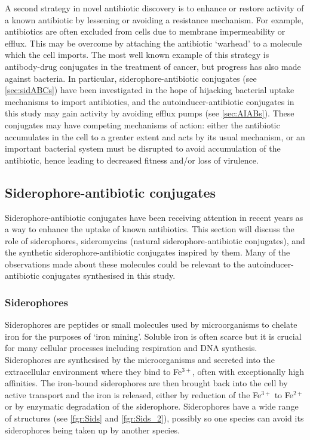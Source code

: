 A second strategy in novel antibiotic discovery is to enhance or restore activity of a known antibiotic by lessening or avoiding a resistance mechanism. For example, antibiotics are often excluded from cells due to membrane impermeability or efflux. This may be overcome by attaching the antibiotic `warhead' to a molecule which the cell imports. The most well known example of this strategy is antibody-drug conjugates\cite{Lambert2018} in the treatment of cancer, but progress has also made against bacteria. In particular, siderophore-antibiotic conjugates (see \ref{sec:sidABCs}) have been investigated in the hope of hijacking bacterial uptake mechanisms to import antibiotics\cite{Page2013}, and the autoinducer-antibiotic conjugates in this study may gain activity by avoiding efflux pumps (see \ref{sec:AIABs}). These conjugates may have competing mechanisms of action: either the antibiotic accumulates in the cell to a greater extent and acts by its usual mechanism, or an important bacterial system must be disrupted to avoid accumulation of the antibiotic, hence leading to decreased fitness and/or loss of virulence.

\subsection{Siderophore-antibiotic conjugates\label{sec:sidABCs}}

Siderophore-antibiotic conjugates have been receiving attention in recent years as a way to enhance the uptake of known antibiotics\cite{Page2013}. This section will discuss the role of siderophores, sideromycins (natural siderophore-antibiotic conjugates), and the synthetic siderophore-antibiotic conjugates inspired by them. Many of the observations made about these molecules could be relevant to the autoinducer-antibiotic conjugates synthesised in this study.

\subsubsection{Siderophores}

Siderophores are peptides or small molecules used by microorganisms to chelate iron for the purposes of `iron mining'\cite{Hider2010}. Soluble iron is often scarce but it is crucial for many cellular processes including respiration and DNA synthesis. Siderophores are synthesised by the microorganisms and secreted into the extracellular environment where they bind to Fe$^{3+}$, often with exceptionally high affinities. The iron-bound siderophores are then brought back into the cell by active transport and the iron is released, either by reduction of the Fe$^{3+}$ to Fe$^{2+}$ or by enzymatic degradation of the siderophore. Siderophores have a wide range of structures (see \ref{fgr:Sids} and \ref{fgr:Sids_2}), possibly so one species can avoid its siderophores being taken up by another species\cite{Seyedsayamdost2012}.

